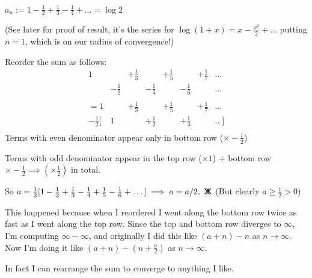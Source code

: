 \begin{example}
$a_n:= 1 - \frac{1}{2} + \frac{1}{3} - \frac{1}{4} + \dots 	= \log 2$

(See later for proof of result, it's the series for $\log(1+x) = x - \frac{x^2}{2} + \dots$ putting $n=1$, which is on our radius of convergence!)

Reorder the sum as follows:
\[\begin{array}{cccccccc}
	1 & ~ & +\frac{1}{3} & ~ & +\frac{1}{5} & ~ & +\frac{1}{7} & \dots \\
	& -\frac{1}{2} & ~ & -\frac{1}{4} & ~ & -\frac{1}{6} & ~ & \dots \\
	&&&&&&&\\
= 	1 & ~ & +\frac{1}{3} & ~ & +\frac{1}{5} & ~ & +\frac{1}{7} & \dots \\
	-\frac{1}{2} [& 1 & ~ & +\frac{1}{2} & ~ & +\frac{1}{3} & ~ & \dots ]\\

\end{array}\]
Terms with even denominator appear only in bottom row ($\times -\frac{1}{2}$)

Terms with odd denominator appear in the top row ($\times 1$) + bottom row $\times -\frac{1}{2} \implies (\times \frac{1}{2})$ in total. 

So $a = \frac{1}{2}[1-\frac{1}{2} + \frac{1}{3} - \frac{1}{4} + \frac{1}{5} -\frac{1}{6} + \dots] \implies a = a/2,~\mathsf{X}\mkern-8.5mu\mathsf{X}$ (But clearly $a \geq \frac{1}{2} > 0$)

\end{example}

This happened because when I reordered I went along the bottom row twice as fast as I went along the top row. Since the top and bottom row diverges to $\infty$, I'm computing $\infty - \infty$, and originally I did this like $(a+n) - n$ as $n \to \infty$. Now I'm doing it like $(a + n) - (n + \frac{a}{2})$ as $n \to \infty$. 


In fact I can rearrange the sum to converge to anything I like.\\

